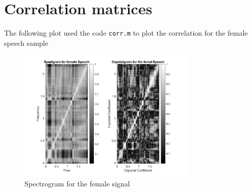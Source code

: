\documentclass{article}
\begin{document}
    \section{Correlation matrices}
    The following plot used the code \texttt{corr.m} to plot the correlation for the female speech sample
    \begin{figure}[H]
        \begin{center}
            \leavevmode
            \includegraphics[width=0.75\textwidth]{corr.jpg}
        \end{center}
        \caption{Spectrogram for the female signal}
    \end{figure}
    \newpage
\end{document}
